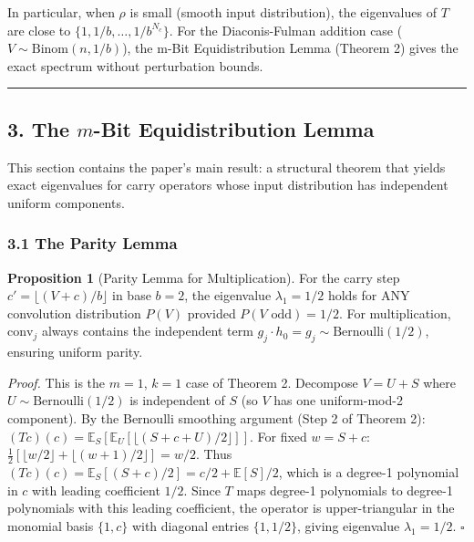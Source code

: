 \documentclass[
  11pt,
]{article}
\begin{document}
In particular, when \(\rho\) is small (smooth input distribution), the
eigenvalues of \(T\) are close to
\(\lbrace{}1, 1/b, \ldots, 1/b^{N_c}\rbrace{}\). For the Diaconis-Fulman
addition case (\(V \sim \text{Binom}(n, 1/b)\)), the m-Bit Equidistribution
Lemma (Theorem 2) gives the exact spectrum without perturbation bounds.

\begin{center}\rule{0.5\linewidth}{0.5pt}\end{center}

\newpage

\subsection{\texorpdfstring{3. The \(m\)-Bit Equidistribution
Lemma}{3. The m-Bit Equidistribution Lemma}}\label{the-m-bit-equidistribution-lemma}

This section contains the paper's main result: a structural theorem that yields
exact eigenvalues for carry operators whose input distribution has independent
uniform components.

\subsubsection{3.1 The Parity Lemma}\label{the-parity-lemma}

\textbf{Proposition 1} (Parity Lemma for Multiplication). For the carry step
\(c' = \lfloor (V+c)/b \rfloor\) in base \(b=2\), the eigenvalue
\(\lambda_1 = 1/2\) holds for ANY convolution distribution \(P(V)\) provided
\(P(V \text{ odd}) = 1/2\). For multiplication, \(\text{conv}_j\) always
contains the independent term
\(g_j \cdot h_0 = g_j \sim \text{Bernoulli}(1/2)\), ensuring uniform parity.

\emph{Proof.} This is the \(m = 1\), \(k = 1\) case of Theorem 2. Decompose
\(V = U + S\) where \(U \sim \text{Bernoulli}(1/2)\) is independent of \(S\) (so
\(V\) has one uniform-mod-2 component). By the Bernoulli smoothing argument
(Step 2 of Theorem 2):
\((Tc)(c) = \mathbb{E}_S[\mathbb{E}_U[\lfloor(S + c + U)/2\rfloor]]\). For fixed
\(w = S + c\):
\(\frac{1}{2}[\lfloor w/2 \rfloor + \lfloor(w+1)/2 \rfloor] = w/2\). Thus
\((Tc)(c) = \mathbb{E}_S[(S+c)/2] = c/2 + \mathbb{E}[S]/2\), which is a degree-1
polynomial in \(c\) with leading coefficient \(1/2\). Since \(T\) maps degree-1
polynomials to degree-1 polynomials with this leading coefficient, the operator
is upper-triangular in the monomial basis \(\lbrace{}1, c\rbrace{}\) with
diagonal entries \(\lbrace{}1, 1/2\rbrace{}\), giving eigenvalue
\(\lambda_1 = 1/2\). \(\square\)
\end{document}
